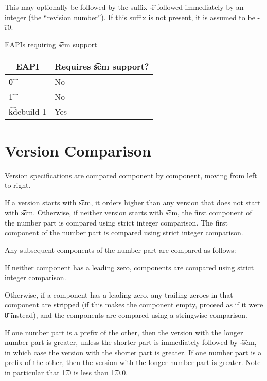This may optionally be followed by the suffix \t{-r} followed immediately by an integer (the
``revision number''). If this suffix is not present, it is assumed to be \t{-r0}.

\IFKDEBUILDELSE
{
    \begin{centertable}{EAPIs requiring \t{scm} support} \label{scm-table}
    \begin{tabular}{ l l }
        \toprule
        \multicolumn{1}{c}{\textbf{EAPI}} &
        \multicolumn{1}{c}{\textbf{Requires \t{scm} support?}} \\
        \midrule
    \t{0} & No \\
    \t{1} & No \\
    \t{kdebuild-1} & Yes \\
    \bottomrule
    \end{tabular}
    \end{centertable}
}{
}

\section{Version Comparison}

Version specifications are compared component by component, moving from left to right.

\IFKDEBUILDELSE
{
    If a version starts with \t{scm}, it orders higher than any version that does not
    start with \t{scm}.  Otherwise, if neither version starts with \t{scm}, the first
    component of the number part is compared using strict integer comparison.
}{
    The first component of the number part is compared using strict integer comparison.
}

Any subsequent components of the number part are compared as follows:

\begin{compactitem}
\item If neither component has a leading zero, components are compared using strict integer
  comparison.
\item Otherwise, if a component has a leading zero, any trailing zeroes in that component
  are stripped (if this makes the component empty, proceed as if it were \t{0} instead),
  and the components are compared using a stringwise comparison.
\end{compactitem}

\IFKDEBUILDELSE
{
    If one number part is a prefix of the other, then the version with the longer number
    part is greater, unless the shorter part is immediately followed by \t{-scm}, in which
    case the version with the shorter part is greater.
}{
    If one number part is a prefix of the other, then the version with the longer number
    part is greater.
}
Note in particular that \t{1.0} is less than \t{1.0.0}.

